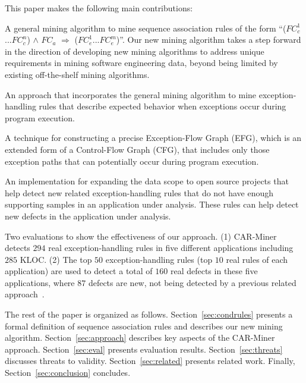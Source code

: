 This paper makes the following main contributions:\vspace*{-1ex}
\begin{Itemize}
\item A general mining algorithm to mine sequence association rules of the form 
``($FC_c^1$...$FC_c^n$) $\wedge$ $FC_a$ $\Rightarrow$ ($FC_e^1$...$FC_e^m$)''.
Our new mining algorithm takes a step forward in the direction 
of developing new mining algorithms to address
unique requirements in mining software engineering data, beyond being limited
by existing off-the-shelf mining algorithms.\vspace*{-2ex}
\item An approach that incorporates the general mining algorithm to mine exception-handling
rules that describe expected behavior when exceptions occur during
program execution. \vspace*{-2ex}
\item A technique for constructing a precise Exception-Flow Graph (EFG), which is an extended form of 
a Control-Flow Graph (CFG), that includes only those exception paths that can potentially occur 
during program execution.\vspace*{-2ex}
\item An implementation for expanding the data scope to open source projects that help
detect new related exception-handling rules that do not have enough supporting samples in an application under analysis.
These rules can help detect new defects in the application under analysis.\vspace*{-2ex}
\item Two evaluations to show
the effectiveness of our approach. (1) CAR-Miner detects $294$ real 
exception-handling rules in five different applications including $285$ KLOC. 
(2) The top $50$ exception-handling
rules (top $10$ real rules of each application)
are used to detect a total of $160$ real defects in these five
applications, where $87$ defects are new, not being detected by a 
previous related approach~\cite{WeimerN05}. 
\end{Itemize}

The rest of the paper is organized as follows. 
Section~\ref{sec:condrules} presents a formal definition of sequence
association rules and describes our new mining algorithm.
Section~\ref{sec:approach} describes key aspects of the CAR-Miner approach.
Section~\ref{sec:eval} presents evaluation results.
Section~\ref{sec:threats} discusses threats to validity.
Section~\ref{sec:related} presents related work.
Finally, Section~\ref{sec:conclusion} concludes.


